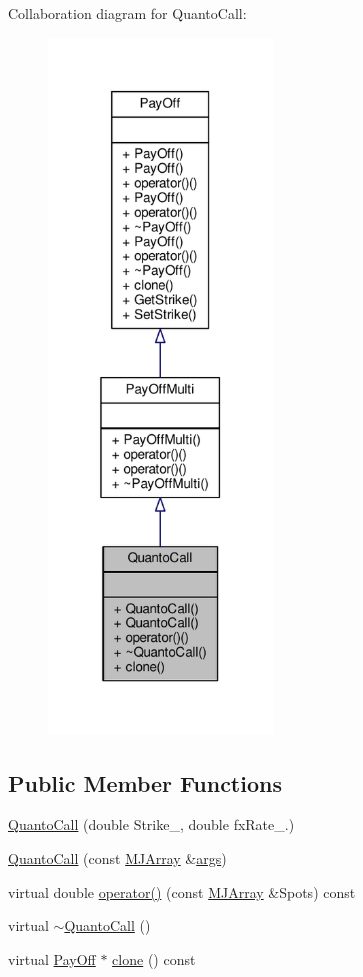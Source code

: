 Collaboration diagram for Quanto\+Call\+:
\nopagebreak
\begin{figure}[H]
\begin{center}
\leavevmode
\includegraphics[width=169pt]{classQuantoCall__coll__graph}
\end{center}
\end{figure}
\subsection*{Public Member Functions}
\begin{DoxyCompactItemize}
\item 
\hyperlink{classQuantoCall_a8e713c9d2e6b9a72d55f524981cfe838}{Quanto\+Call} (double Strike\+\_\+, double fx\+Rate\+\_.)
\item 
\hyperlink{classQuantoCall_ae1be4dc5d31fedff93f80d9db5819f8a}{Quanto\+Call} (const \hyperlink{classMJArray}{M\+J\+Array} \&\hyperlink{path__generation_8h_a75c13cde2074f502cc4348c70528572d}{args})
\item 
virtual double \hyperlink{classQuantoCall_a4269b10b960c3d71cd01b4bd889534ae}{operator()} (const \hyperlink{classMJArray}{M\+J\+Array} \&Spots) const
\item 
virtual \hyperlink{classQuantoCall_a044fed51d92c3899e6468e3d918f0191}{$\sim$\+Quanto\+Call} ()
\item 
virtual \hyperlink{classPayOff}{Pay\+Off} $\ast$ \hyperlink{classQuantoCall_a93f79639f06467ab145108dc15bba830}{clone} () const
\end{DoxyCompactItemize}
